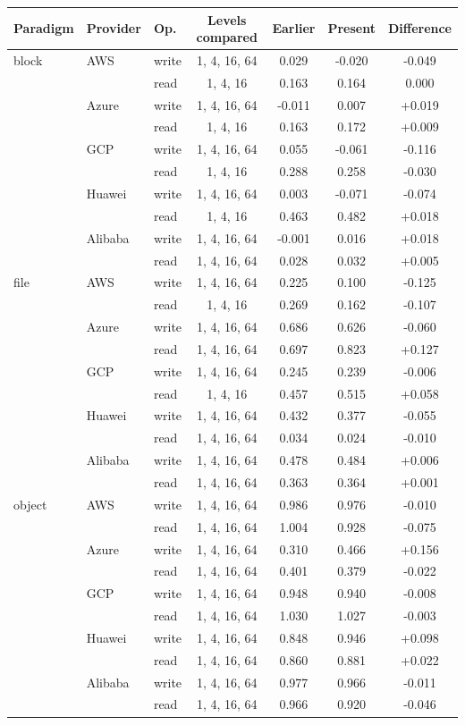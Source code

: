 \begin{tabular}{lllcccc}
\toprule
Paradigm & Provider & Op. & Levels compared & Earlier & Present & Difference \\
\midrule
block & AWS & write & 1, 4, 16, 64 & 0.029 & -0.020 & -0.049 \\
 &  & read & 1, 4, 16 & 0.163 & 0.164 & 0.000 \\
 & Azure & write & 1, 4, 16, 64 & -0.011 & 0.007 & +0.019 \\
 &  & read & 1, 4, 16 & 0.163 & 0.172 & +0.009 \\
 & GCP & write & 1, 4, 16, 64 & 0.055 & -0.061 & -0.116 \\
 &  & read & 1, 4, 16 & 0.288 & 0.258 & -0.030 \\
 & Huawei & write & 1, 4, 16, 64 & 0.003 & -0.071 & -0.074 \\
 &  & read & 1, 4, 16 & 0.463 & 0.482 & +0.018 \\
 & Alibaba & write & 1, 4, 16, 64 & -0.001 & 0.016 & +0.018 \\
 &  & read & 1, 4, 16, 64 & 0.028 & 0.032 & +0.005 \\
\midrule
file & AWS & write & 1, 4, 16, 64 & 0.225 & 0.100 & -0.125 \\
 &  & read & 1, 4, 16 & 0.269 & 0.162 & -0.107 \\
 & Azure & write & 1, 4, 16, 64 & 0.686 & 0.626 & -0.060 \\
 &  & read & 1, 4, 16, 64 & 0.697 & 0.823 & +0.127 \\
 & GCP & write & 1, 4, 16, 64 & 0.245 & 0.239 & -0.006 \\
 &  & read & 1, 4, 16 & 0.457 & 0.515 & +0.058 \\
 & Huawei & write & 1, 4, 16, 64 & 0.432 & 0.377 & -0.055 \\
 &  & read & 1, 4, 16, 64 & 0.034 & 0.024 & -0.010 \\
 & Alibaba & write & 1, 4, 16, 64 & 0.478 & 0.484 & +0.006 \\
 &  & read & 1, 4, 16, 64 & 0.363 & 0.364 & +0.001 \\
\midrule
object & AWS & write & 1, 4, 16, 64 & 0.986 & 0.976 & -0.010 \\
 &  & read & 1, 4, 16, 64 & 1.004 & 0.928 & -0.075 \\
 & Azure & write & 1, 4, 16, 64 & 0.310 & 0.466 & +0.156 \\
 &  & read & 1, 4, 16, 64 & 0.401 & 0.379 & -0.022 \\
 & GCP & write & 1, 4, 16, 64 & 0.948 & 0.940 & -0.008 \\
 &  & read & 1, 4, 16, 64 & 1.030 & 1.027 & -0.003 \\
 & Huawei & write & 1, 4, 16, 64 & 0.848 & 0.946 & +0.098 \\
 &  & read & 1, 4, 16, 64 & 0.860 & 0.881 & +0.022 \\
 & Alibaba & write & 1, 4, 16, 64 & 0.977 & 0.966 & -0.011 \\
 &  & read & 1, 4, 16, 64 & 0.966 & 0.920 & -0.046 \\
\bottomrule
\end{tabular}
